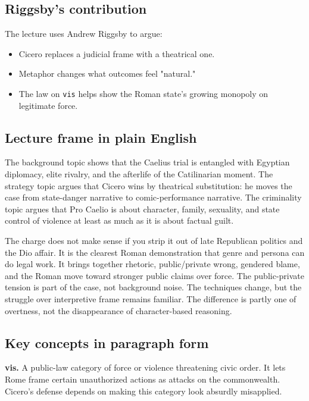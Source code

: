 \documentclass[11pt]{article}
\begin{document}
\subsection{Riggsby's contribution}

The lecture uses Andrew Riggsby to argue:

\begin{itemize}
\item Cicero replaces a judicial frame with a theatrical one.
\item Metaphor changes what outcomes feel "natural."
\item The law on \texttt{vis} helps show the Roman state's growing monopoly on legitimate force.
\end{itemize}

\subsection{Lecture frame in plain English}

The background topic shows that the Caelius trial is entangled with Egyptian diplomacy, elite rivalry, and the afterlife of the Catilinarian moment. The strategy topic argues that Cicero wins by theatrical substitution: he moves the case from state-danger narrative to comic-performance narrative. The criminality topic argues that Pro Caelio is about character, family, sexuality, and state control of violence at least as much as it is about factual guilt.

The charge does not make sense if you strip it out of late Republican politics and the Dio affair. It is the clearest Roman demonstration that genre and persona can do legal work. It brings together rhetoric, public/private wrong, gendered blame, and the Roman move toward stronger public claims over force. The public-private tension is part of the case, not background noise. The techniques change, but the struggle over interpretive frame remains familiar. The difference is partly one of overtness, not the disappearance of character-based reasoning.

\subsection{Key concepts in paragraph form}

\textbf{vis.} A public-law category of force or violence threatening civic order. It lets Rome frame certain unauthorized actions as attacks on the commonwealth. Cicero's defense depends on making this category look absurdly misapplied.
\end{document}
